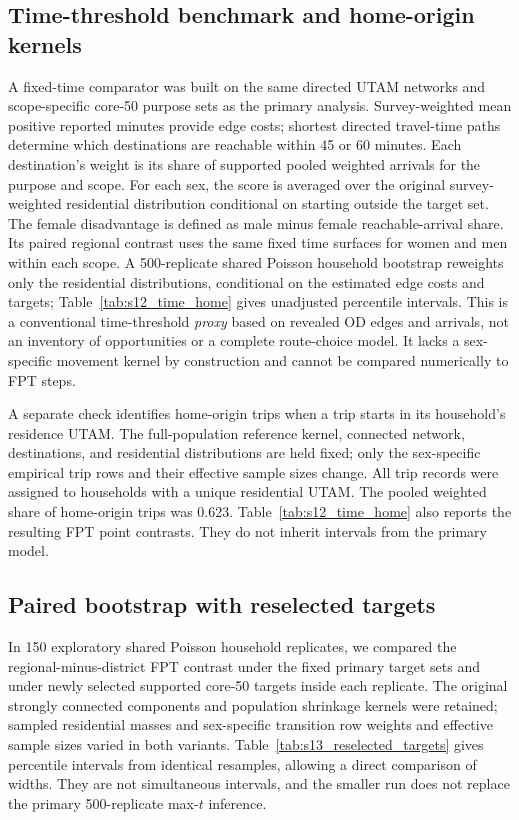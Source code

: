\documentclass[11pt]{article}
\begin{document}


\subsection{Time-threshold benchmark and home-origin kernels}
A fixed-time comparator was built on the same directed UTAM networks and
scope-specific core-50 purpose sets as the primary analysis. Survey-weighted
mean positive reported minutes provide edge costs; shortest directed
travel-time paths determine which destinations are reachable within 45 or
60 minutes. Each destination's weight is its share of supported pooled
weighted arrivals for the purpose and scope. For each sex, the score is
averaged over the original survey-weighted residential distribution
conditional on starting outside the target set. The female disadvantage is
defined as male minus female reachable-arrival share. Its paired regional
contrast uses the same fixed time surfaces for women and men within each
scope. A 500-replicate shared Poisson household bootstrap reweights only
the residential distributions, conditional on the estimated edge costs
and targets; Table~\ref{tab:s12_time_home} gives unadjusted percentile
intervals. This is a conventional time-threshold \emph{proxy} based on
revealed OD edges and arrivals, not an inventory of opportunities or a
complete route-choice model. It lacks a sex-specific movement kernel by
construction and cannot be compared numerically to FPT steps.

A separate check identifies home-origin trips when a trip starts in its
household's residence UTAM. The full-population reference kernel,
connected network, destinations, and residential distributions are held fixed;
only the sex-specific empirical trip rows and their effective sample
sizes change. All trip records were assigned to households with a unique
residential UTAM. The pooled weighted share of home-origin trips was
0.623. Table~\ref{tab:s12_time_home} also reports the resulting FPT
point contrasts. They do not inherit intervals from the primary model.



\subsection{Paired bootstrap with reselected targets}
In 150 exploratory shared Poisson household replicates, we compared the
regional-minus-district FPT contrast under the fixed primary target sets
and under newly selected supported core-50 targets inside each replicate.
The original strongly connected components and population shrinkage
kernels were retained; sampled residential masses and sex-specific
transition row weights and effective sample sizes varied in both variants.
Table~\ref{tab:s13_reselected_targets} gives percentile intervals
from identical resamples, allowing a direct comparison of widths.
They are not simultaneous intervals, and the smaller run does not replace
the primary 500-replicate max-$t$ inference.
\end{document}
